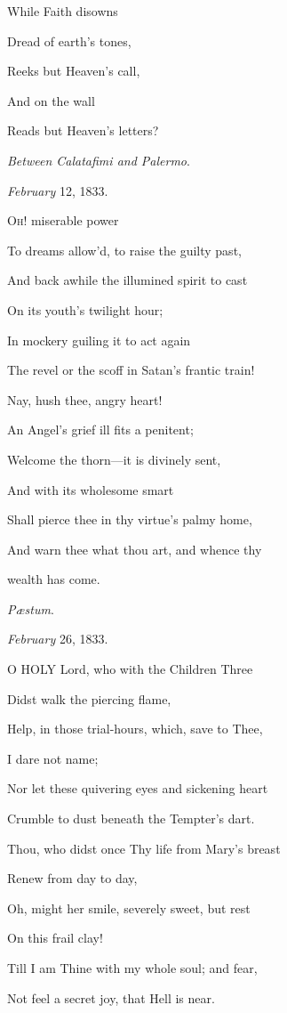 While Faith disowns

Dread of earth's tones,

Reeks but Heaven's call,

And on the wall

Reads but Heaven's letters?

\emph{Between Calatafimi and Palermo}.

\emph{February} 12, 1833.


O\textsc{h}! miserable power

To dreams allow'd, to raise the guilty past,

And back awhile the illumined spirit to cast

On its youth's twilight
hour;

In mockery guiling it to act again

The revel or the scoff in Satan's frantic train!

Nay, hush thee, angry
heart!

An Angel's grief ill fits a penitent;

Welcome the thorn—it is divinely sent,

And with its wholesome
smart

Shall pierce thee in thy virtue's palmy home,

And warn thee what thou art, and whence thy

wealth has come.

\emph{Pæstum}.

\emph{February} 26, 1833.


O HOLY Lord, who with the Children Three

Didst walk the
piercing flame,

Help, in those trial-hours, which, save to Thee,

I dare not name;

Nor let these quivering eyes and sickening heart

Crumble to dust beneath the Tempter's dart.

Thou, who didst once Thy life from Mary's breast

Renew from day to
day,

Oh, might her smile, severely sweet, but rest

On this frail clay!

Till I am Thine with my whole soul; and fear,

Not feel a secret joy, that Hell is near.

